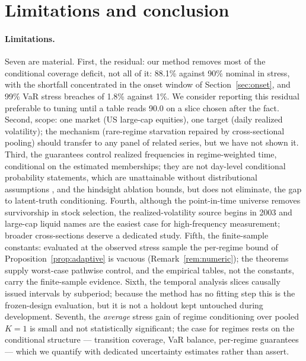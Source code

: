 \section{Limitations and conclusion}\label{sec:conclusion}

\paragraph{Limitations.} Seven are material. First, the residual: our
method removes most of the conditional coverage deficit, not all of it:
88.1\% against 90\% nominal in stress, with the shortfall concentrated in
the onset window of Section~\ref{sec:onset}, and 99\% VaR stress breaches
of 1.8\% against 1\%. We consider reporting this residual preferable to
tuning until a table reads 90.0 on a slice chosen after the fact. Second,
scope: one market (US large-cap equities), one target (daily realized
volatility); the mechanism (rare-regime starvation repaired by
cross-sectional pooling) should transfer to any panel of related
series, but we have not shown it. Third, the guarantees control realized
frequencies in regime-weighted time, conditional on the estimated
memberships; they are not day-level conditional probability statements,
which are unattainable without distributional assumptions
\citep{foygelbarber2021limits}, and the hindsight ablation bounds, but
does not eliminate, the gap to latent-truth conditioning. Fourth,
although the point-in-time universe removes survivorship in stock
selection, the realized-volatility source begins in 2003 and large-cap
liquid names are the easiest case for high-frequency measurement; broader
cross-sections deserve a dedicated study. Fifth, the finite-sample
constants: evaluated at the observed stress sample the per-regime bound
of Proposition~\ref{prop:adaptive} is vacuous
(Remark~\ref{rem:numeric}); the theorems supply worst-case pathwise
control, and the empirical tables, not the constants, carry the
finite-sample evidence. Sixth, the temporal analysis slices causally
issued intervals by subperiod; because the method has no fitting step
this is the frozen-design evaluation, but it is not a holdout kept
untouched during development. Seventh, the \emph{average} stress gain of
regime conditioning over pooled $K = 1$ is small and not statistically
significant; the case for regimes rests on the conditional structure
--- transition coverage, VaR balance, per-regime guarantees --- which we
quantify with dedicated uncertainty estimates rather than assert.

